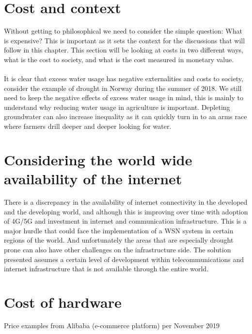 \documentclass[]{uiophd}
\begin{document}
\section{Cost and context}
Without getting to philosophical we need to consider the simple question: What is expensive? This is important as it sets the context for the discussions that will follow in this chapter. This section will be looking at costs in two different ways, what is the cost to society, and what is the cost measured in monetary value.
\\\\
It is clear that excess water usage has negative externalities and costs to society, consider the example of drought in Norway during the summer of 2018. We still need to keep the negative effects of excess water usage in mind, this is mainly to understand why reducing water usage in agriculture is important. Depleting groundwater can also increase inequality as it can quickly turn in to an arms race where farmers drill deeper and deeper looking for water.
\section{Considering the world wide availability of the internet}
There is a discrepancy in the availability of internet connectivity in the developed and the developing world, and although this is improving over time with adoption of 4G/5G and investment in internet and communication infrastructure. This is a major hurdle that could face the implementation of a WSN system in certain regions of the world. And unfortunately the areas that are especially drought prone can also have other challenges on the infrastructure side. The solution presented assumes a certain level of development within telecommunications and internet infrastructure that is not available through the entire world.
\section{Cost of hardware}

Price examples from Alibaba (e-commerce platform) per November 2019
\end{document}
